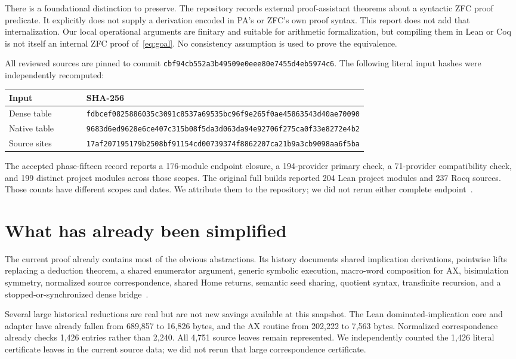 \documentclass[11pt,letterpaper]{article}
\theoremstyle{definition}\newtheorem{definition}[theorem]{Definition}
\newcommand{\base}{cbf94cb552a3b49509e0eee80e7455d4eb5974c6}
\begin{document}
There is a foundational distinction to preserve. The repository records external proof-assistant theorems about a syntactic ZFC proof predicate. It explicitly does not supply a derivation encoded in PA's or ZFC's own proof syntax. This report does not add that internalization. Our local operational arguments are finitary and suitable for arithmetic formalization, but compiling them in Lean or Coq is not itself an internal ZFC proof of~\eqref{eq:goal}. No consistency assumption is used to prove the equivalence.

All reviewed sources are pinned to commit \texttt{\base}. The following literal input hashes were independently recomputed:
\begin{center}
\begin{tabular}{@{}lp{0.70\linewidth}@{}}
\toprule Input & SHA-256\\\midrule
Dense table & \nolinkurl{fdbcef0825886035c3091c8537a69535bc96f9e265f0ae45863543d40ae70090}\\
Native table & \nolinkurl{9683d6ed9628e6ce407c315b08f5da3d063da94e92706f275ca0f33e8272e4b2}\\
Source sites & \nolinkurl{17af207195179b2508bf91154cd00739374f8862207ca21b9a3cb9098aa6f5ba}\\
\bottomrule
\end{tabular}
\end{center}
The accepted phase-fifteen record reports a 176-module endpoint closure, a 194-provider primary check, a 71-provider compatibility check, and 199 distinct project modules across those scopes. The original full builds reported 204 Lean project modules and 237 Rocq sources. Those counts have different scopes and dates. We attribute them to the repository; we did not rerun either complete endpoint~\cite{phase15,verification}.

\section{What has already been simplified}
The current proof already contains most of the obvious abstractions. Its history documents shared implication derivations, pointwise lifts replacing a deduction theorem, a shared enumerator argument, generic symbolic execution, macro-word composition for AX, bisimulation symmetry, normalized source correspondence, shared Home returns, semantic seed sharing, quotient syntax, transfinite recursion, and a stopped-or-synchronized dense bridge~\cite{simplification}.

Several large historical reductions are real but are not new savings available at this snapshot. The Lean dominated-implication core and adapter have already fallen from 689,857 to 16,826 bytes, and the AX routine from 202,222 to 7,563 bytes. Normalized correspondence already checks 1,426 entries rather than 2,240. All 4,751 source leaves remain represented. We independently counted the 1,426 literal certificate leaves in the current source data; we did not rerun that large correspondence certificate.
\end{document}
